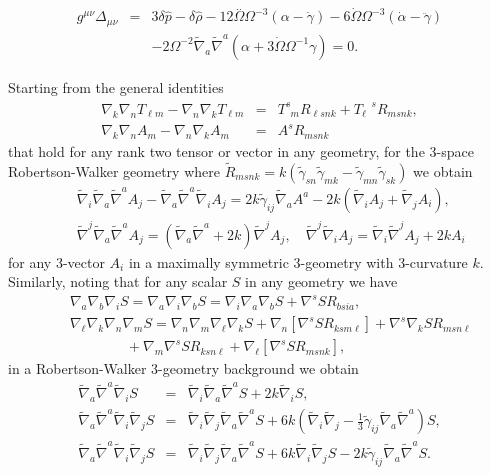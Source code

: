 %
%
\begin{eqnarray}
g^{\mu\nu}\Delta_{\mu\nu}&=& 3 \delta \hat{p} -  \delta \hat{\rho}
-12 \overset{..}{\Omega}  \Omega^{-3}(\alpha - \dot\gamma) -6 \dot{\Omega} \Omega^{-3}(\dot{\alpha} -\ddot\gamma)
\nonumber\\
&&
-2 \Omega^{-2} \tilde{\nabla}_{a}\tilde{\nabla}^{a}(\alpha +3\dot\Omega\Omega^{-1}\gamma)=0.
\label{9.17}
\end{eqnarray}
%

Starting from the general identities
%
\begin{eqnarray}
\nabla_{k}\nabla_{n}T_{\ell m}-\nabla_{n}\nabla_{k}T_{\ell m}&=&T^{s}_{\phantom{s}m}R_{\ell s n k}+T_{\ell}^{\phantom{\ell}s}R_{ms n k},
\nonumber\\
\nabla_{k}\nabla_{n}A_{m}-\nabla_{n}\nabla_{k}A_{m}&=&A^{s}R_{ms n k}
\label{9.18}
\end{eqnarray}
%
that hold for any rank two tensor or vector in any geometry, for the 3-space Robertson-Walker geometry where $\tilde{R}_{msnk}=k(\tilde{\gamma}_{sn}\tilde{\gamma}_{mk}-\tilde{\gamma}_{mn}\tilde{\gamma}_{sk})$ 
we obtain
%
\begin{eqnarray}
&&\tilde\nabla_i\tilde\nabla_a\tilde\nabla^aA_j-\tilde\nabla_a\tilde\nabla^a\tilde\nabla_iA_j 
= 2k\tilde{\gamma}_{ij}\tilde{\nabla}_aA^a-2k(\tilde\nabla_i A_j + \tilde\nabla_j A_i),
\nonumber\\
&&\tilde\nabla^j\tilde\nabla_a\tilde\nabla^aA_j=
(\tilde\nabla_a\tilde\nabla^a+2k)\tilde\nabla^j A_j,\quad \tilde{\nabla}^j\tilde{\nabla}_iA_j=\tilde{\nabla}_i\tilde{\nabla}^jA_j+2kA_i
\label{9.19}
\end{eqnarray}
%
for any 3-vector $A_i$ in a maximally symmetric 3-geometry with 3-curvature $k$. Similarly, noting that for any scalar $S$ in any geometry we have
%
\begin{eqnarray}
&&\nabla_a\nabla_b\nabla_iS=\nabla_a\nabla_i\nabla_bS=\nabla_i\nabla_a\nabla_bS+\nabla^sSR_{bsia},
\nonumber\\
&&\nabla_{\ell}\nabla_k\nabla_n\nabla_{m}S=\nabla_n\nabla_{m}\nabla_{\ell}\nabla_kS
+\nabla_{n}[\nabla^sSR_{ksm\ell}]
+\nabla^s\nabla_kSR_{msn\ell}
\nonumber\\
&&\qquad\qquad+\nabla_m\nabla^sSR_{ksn\ell}
+\nabla_{\ell}[\nabla^sSR_{msnk}],
\label{9.20}
\end{eqnarray}
%
in a Robertson-Walker 3-geometry background we obtain 
%
\begin{eqnarray}
\tilde{\nabla}_a\tilde{\nabla}^a\tilde{\nabla}_iS&=&\tilde{\nabla}_i\tilde{\nabla}_a\tilde{\nabla}^aS+2k\tilde{\nabla}_iS,
\nonumber\\ \tilde{\nabla}_a\tilde{\nabla}^a\tilde{\nabla}_i\tilde{\nabla}_jS&=&\tilde{\nabla}_i\tilde{\nabla}_j\tilde{\nabla}_a\tilde{\nabla}^aS+6k(\tilde{\nabla}_i\tilde{\nabla}_j-\tfrac{1}{3}\tilde{\gamma}_{ij}\tilde{\nabla}_a\tilde{\nabla}^a)S,
\nonumber\\
\tilde{\nabla}_a\tilde{\nabla}^a\tilde{\nabla}_i\tilde{\nabla}_{j}S&=&\tilde{\nabla}_i\tilde{\nabla}_{j}\tilde{\nabla}_a\tilde{\nabla}^aS
+6k\tilde{\nabla}_i\tilde{\nabla}_{j}S-2k\tilde{\gamma}_{ij}\tilde{\nabla}_a\tilde{\nabla}^aS.
\label{9.21}
\end{eqnarray}
